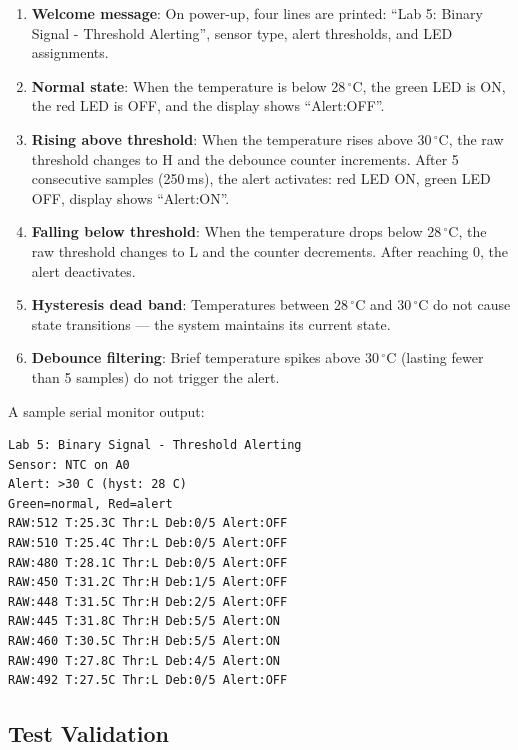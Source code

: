 \documentclass[12pt]{article}
\begin{document}
\begin{enumerate}
  \item \textbf{Welcome message}: On power-up, four lines are printed: ``Lab 5: Binary Signal - Threshold Alerting'', sensor type, alert thresholds, and LED assignments.

  \item \textbf{Normal state}: When the temperature is below 28\,\(^{\circ}\)C, the green LED is ON, the red LED is OFF, and the display shows ``Alert:OFF''.

  \item \textbf{Rising above threshold}: When the temperature rises above 30\,\(^{\circ}\)C, the raw threshold changes to H and the debounce counter increments. After 5 consecutive samples (250\,ms), the alert activates: red LED ON, green LED OFF, display shows ``Alert:ON''.

  \item \textbf{Falling below threshold}: When the temperature drops below 28\,\(^{\circ}\)C, the raw threshold changes to L and the counter decrements. After reaching 0, the alert deactivates.

  \item \textbf{Hysteresis dead band}: Temperatures between 28\,\(^{\circ}\)C and 30\,\(^{\circ}\)C do not cause state transitions --- the system maintains its current state.

  \item \textbf{Debounce filtering}: Brief temperature spikes above 30\,\(^{\circ}\)C (lasting fewer than 5 samples) do not trigger the alert.
\end{enumerate}

A sample serial monitor output:

\begin{lstlisting}
Lab 5: Binary Signal - Threshold Alerting
Sensor: NTC on A0
Alert: >30 C (hyst: 28 C)
Green=normal, Red=alert
RAW:512 T:25.3C Thr:L Deb:0/5 Alert:OFF
RAW:510 T:25.4C Thr:L Deb:0/5 Alert:OFF
RAW:480 T:28.1C Thr:L Deb:0/5 Alert:OFF
RAW:450 T:31.2C Thr:H Deb:1/5 Alert:OFF
RAW:448 T:31.5C Thr:H Deb:2/5 Alert:OFF
RAW:445 T:31.8C Thr:H Deb:5/5 Alert:ON
RAW:460 T:30.5C Thr:H Deb:5/5 Alert:ON
RAW:490 T:27.8C Thr:L Deb:4/5 Alert:ON
RAW:492 T:27.5C Thr:L Deb:0/5 Alert:OFF
\end{lstlisting}

\subsection{Test Validation}
\end{document}
